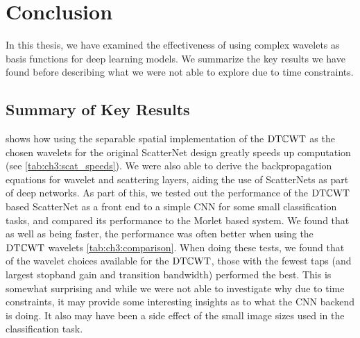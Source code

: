 \chapter{Conclusion}\label{ch:conclusion}
\def \path {intro/}
\def \imgpath {intro/images}

In this thesis, we have examined the effectiveness of using complex wavelets as
basis functions for deep learning models. We summarize the key results we have
found before describing what we were not able to explore due to time constraints.


\section{Summary of Key Results}
\textbf{} shows how using the separable spatial implementation of 
the $\mathrm{DT}\mathbb{C}\mathrm{WT}$ as the chosen wavelets for the original ScatterNet design greatly
speeds up computation (see \autoref{tab:ch3:scat_speeds}). We were also able to
derive the backpropagation equations for wavelet and scattering layers, aiding
the use of ScatterNets as part of deep networks. As part of this, we tested out
the performance of the $\mathrm{DT}\mathbb{C}\mathrm{WT}$ based ScatterNet as a front end to a simple CNN for 
some small classification tasks, and compared its performance to the Morlet based system. We
found that as well as being faster, the performance was often better when using
the $\mathrm{DT}\mathbb{C}\mathrm{WT}$ wavelets \autoref{tab:ch3:comparison}. When doing these tests, we
found that of the wavelet choices available for the $\mathrm{DT}\mathbb{C}\mathrm{WT}$, those with the
fewest taps (and largest stopband gain and transition bandwidth) performed the best. This is
somewhat surprising and while we were not able to investigate why due to time
constraints, it may provide some interesting insights as to what the CNN backend 
is doing. It also may have been a side effect of the small image sizes used in the
classification task.

